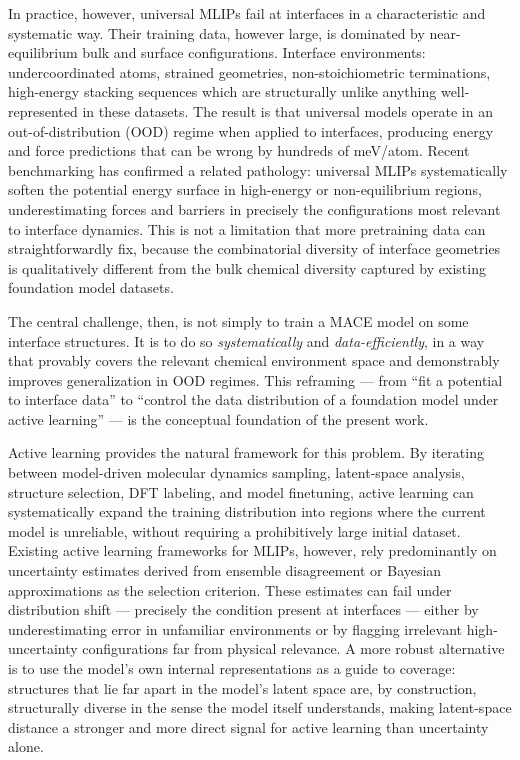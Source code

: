 \documentclass[12pt,a4paper,oneside]{book}
\begin{document}
In practice, however, universal MLIPs fail at interfaces in a characteristic and
systematic way. Their training data, however large, is dominated by near-equilibrium
bulk and surface configurations. Interface environments: undercoordinated atoms,
strained geometries, non-stoichiometric terminations, high-energy stacking sequences
which are structurally unlike anything well-represented in these datasets. The result is
that universal models operate in an out-of-distribution (OOD) regime when applied to
interfaces, producing energy and force predictions that can be wrong by hundreds of
meV/atom. Recent benchmarking has confirmed a related pathology: universal MLIPs
systematically soften the potential energy surface in high-energy or non-equilibrium
regions, underestimating forces and barriers in precisely the configurations most
relevant to interface dynamics.
\cite{Deng2025Softening,Liu2023Discrepancies,Morrow2023Validate}
This is not a limitation that more pretraining data can straightforwardly fix,
because the combinatorial diversity of interface geometries is qualitatively different
from the bulk chemical diversity captured by existing foundation model datasets.

The central challenge, then, is not simply to train a MACE model on some interface
structures. It is to do so \emph{systematically} and \emph{data-efficiently}, in a
way that provably covers the relevant chemical environment space and demonstrably
improves generalization in OOD regimes. This reframing --- from ``fit a potential
to interface data'' to ``control the data distribution of a foundation model under
active learning'' --- is the conceptual foundation of the present work.

Active learning provides the natural framework for this problem. By iterating between
model-driven molecular dynamics sampling, latent-space analysis, structure selection,
DFT labeling, and model finetuning, active learning can systematically expand the
training distribution into regions where the current model is unreliable, without
requiring a prohibitively large initial dataset.
\cite{Zhang2019DPGEN,Vandermause2020FLARE,Wen2020}
Existing active learning frameworks for MLIPs, however, rely predominantly on
uncertainty estimates derived from ensemble disagreement or Bayesian approximations
as the selection criterion. These estimates can fail under distribution shift ---
precisely the condition present at interfaces --- either by underestimating error in
unfamiliar environments or by flagging irrelevant high-uncertainty configurations
far from physical relevance. A more robust alternative is to use the model's own
internal representations as a guide to coverage: structures that lie far apart in the
model's latent space are, by construction, structurally diverse in the sense the model
itself understands, making latent-space distance a stronger and more direct signal
for active learning than uncertainty alone.
\cite{Kulichenko2024review,Deng2025Softening}
\end{document}

